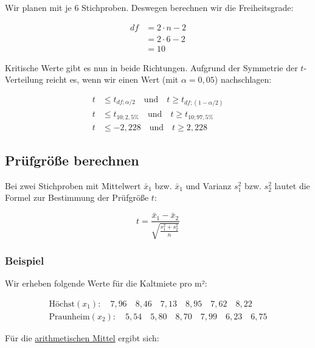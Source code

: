 \documentclass[
  11pt,
  ngerman,
  a4paper,
]{report}
\begin{document}
Wir planen mit je 6 Stichproben. Deswegen berechnen wir die Freiheitsgrade:

\[
\begin{aligned}
\mathit{df} &= 2 \cdot n -2\\
            &= 2 \cdot 6 - 2\\
            &= 10
\end{aligned}
\]

Kritische Werte gibt es nun in beide Richtungen. Aufgrund der Symmetrie der \(t\)-Verteilung reicht es, wenn wir einen Wert (mit \(\alpha=0{,}05\)) nachschlagen:

\[\begin{aligned}
t &\leq t_{\mathit{df};\alpha/2} \quad \textrm{und} \quad t \geq t_{\mathit{df};(1-\alpha/2)}\\
t &\leq t_{10;2{,}5\%} \quad \textrm{und} \quad t \geq t_{10;97{,}5\%}\\
t &\leq -2{,}228 \quad \textrm{und} \quad t \geq 2{,}228
\end{aligned}\]

\hypertarget{pruxfcfgruxf6uxdfe-berechnen-2}{%
\subsection{Prüfgröße berechnen}\label{pruxfcfgruxf6uxdfe-berechnen-2}}

Bei zwei Stichproben mit Mittelwert \(\bar{x}_1\) bzw. \(\bar{x}_1\) und Varianz \(s^2_1\) bzw. \(s^2_2\) lautet die Formel zur Bestimmung der Prüfgröße \(t\):

\[
t=\frac{\bar{x}_1-\bar{x}_2}{\sqrt{\frac{s^2_1+s^2_2}{n}}}
\label{eq:t2sp}
\]

\hypertarget{beispiel-15}{%
\subsubsection{Beispiel}\label{beispiel-15}}

Wir erheben folgende Werte für die Kaltmiete pro m²:

\[
\begin{aligned}
\textrm{Höchst} (x_1): \quad7{,}96\quad8{,}46\quad7{,}13\quad8{,}95\quad7{,}62\quad8{,}22\\
\textrm{Praunheim} (x_2): \quad5{,}54\quad5{,}80\quad8{,}70\quad7{,}99\quad6{,}23\quad6{,}75
\end{aligned}
\]

Für die \protect\hyperlink{arithmetisches-mittel}{arithmetischen Mittel} ergibt sich:
\end{document}
